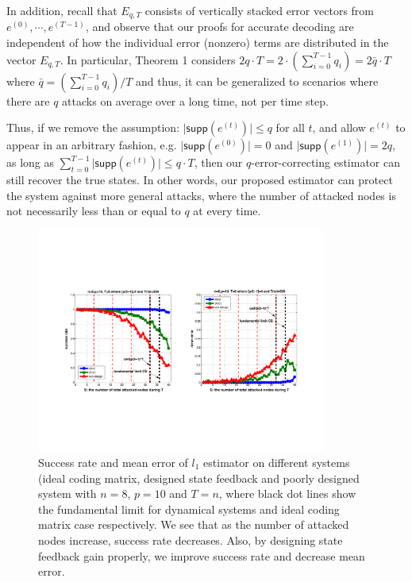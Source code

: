 \documentclass[../../thesis.tex]{subfiles}
\begin{document}
In addition, recall that $E_{q,T}$ consists of vertically stacked error vectors from $e^{(0)}, \cdots, e^{(T-1)}$, and observe that our proofs for accurate decoding are independent of how the individual error (nonzero) terms are distributed in the vector $E_{q,T}$. In particular, %
Theorem 1 considers $2 q \cdot T = 2 \cdot (\sum_{i=0}^{T-1} q_i) = 2 \bar q \cdot T$ where $\bar q = (\sum_{i=0}^{T-1} q_i ) /T$ and thus, it can be generalized to scenarios where there are $q$ attacks on average over a long time, not per time step.

Thus, if we remove the assumption: $\lvert \textsf{supp} (e^{(t)}) \rvert \le q$ for all $t$, and allow $e^{(t)}$ to appear in an arbitrary fashion, e.g. $\lvert \textsf{supp} (e^{(0)}) \rvert = 0$ and $\lvert \textsf{supp} (e^{(1)}) \rvert = 2q$, as long as $\sum_{t=0}^{T-1} \lvert \textsf{supp} (e^{(t)}) \rvert \leq q\cdot T$, then our $q$-error-correcting estimator can still recover the true states. In other words, our proposed estimator can protect the system against more general attacks, where the number of attacked nodes is not necessarily less than or equal to $q$ at every time.
\begin{figure}[!t]
\center
\includegraphics[width=0.85\textwidth]{chapters/se_linear/figures/performance_n8p10.pdf}
\caption{Success rate and mean error of $l_1$ estimator on different systems (ideal coding matrix, designed state feedback and poorly designed system with $n=8$, $p=10$ and $T=n$, where black dot lines show the fundamental limit for dynamical systems and ideal coding matrix case respectively. We see that as the number of attacked nodes increase, success rate decreases. Also, by designing state feedback gain properly, we improve success rate and decrease mean error. }
\label{fig:ex_n8p10}
\end{figure}
\end{document}
